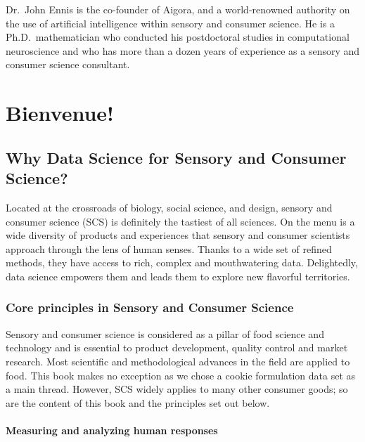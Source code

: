 \documentclass[
]{krantz}
\begin{document}
Dr.~John Ennis is the co-founder of Aigora, and a world-renowned authority on the use of artificial intelligence within sensory and consumer science. He is a Ph.D.~mathematician who conducted his postdoctoral studies in computational neuroscience and who has more than a dozen years of experience as a sensory and consumer science consultant.

\mainmatter

\hypertarget{bienvenue}{%
\chapter{Bienvenue!}\label{bienvenue}}

\hypertarget{why-data-science-for-sensory-and-consumer-science}{%
\section{Why Data Science for Sensory and Consumer Science?}\label{why-data-science-for-sensory-and-consumer-science}}

Located at the crossroads of biology, social science, and design, sensory and consumer science (SCS) is definitely the tastiest of all sciences. On the menu is a wide diversity of products and experiences that sensory and consumer scientists approach through the lens of human senses. Thanks to a wide set of refined methods, they have access to rich, complex and mouthwatering data. Delightedly, data science empowers them and leads them to explore new flavorful territories.

\hypertarget{core-principles-in-sensory-and-consumer-science}{%
\subsection{Core principles in Sensory and Consumer Science}\label{core-principles-in-sensory-and-consumer-science}}

Sensory and consumer science is considered as a pillar of food science and technology and is essential to product development, quality control and market research. Most scientific and methodological advances in the field are applied to food. This book makes no exception as we chose a cookie formulation data set as a main thread. However, SCS widely applies to many other consumer goods; so are the content of this book and the principles set out below.

\hypertarget{measuring-and-analyzing-human-responses}{%
\subsubsection{Measuring and analyzing human responses}\label{measuring-and-analyzing-human-responses}}
\end{document}
